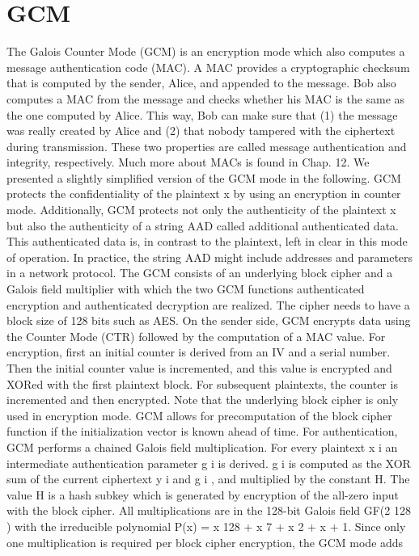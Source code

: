 \documentclass{article}
\begin{document}
\section{GCM}
The Galois Counter Mode (GCM) is an encryption mode which also computes a
message authentication code (MAC). A MAC provides a cryptographic checksum that is computed by the sender, Alice, and appended to the message. Bob also
computes a MAC from the message and checks whether his MAC is the same as
the one computed by Alice. This way, Bob can make sure that (1) the message was
really created by Alice and (2) that nobody tampered with the ciphertext during
transmission. These two properties are called message authentication and integrity,
respectively. Much more about MACs is found in Chap. 12. We presented a slightly
simplified version of the GCM mode in the following.
GCM protects the confidentiality of the plaintext x by using an encryption in
counter mode. Additionally, GCM protects not only the authenticity of the plaintext
x but also the authenticity of a string AAD called additional authenticated data.
This authenticated data is, in contrast to the plaintext, left in clear in this mode of
operation. In practice, the string AAD might include addresses and parameters in a
network protocol.
The GCM consists of an underlying block cipher and a Galois field multiplier
with which the two GCM functions authenticated encryption and authenticated decryption are realized. The cipher needs to have a block size of 128 bits such as AES.
On the sender side, GCM encrypts data using the Counter Mode (CTR) followed by
the computation of a MAC value. For encryption, first an initial counter is derived
from an IV and a serial number. Then the initial counter value is incremented, and
this value is encrypted and XORed with the first plaintext block. For subsequent
plaintexts, the counter is incremented and then encrypted. Note that the underlying
block cipher is only used in encryption mode. GCM allows for precomputation of
the block cipher function if the initialization vector is known ahead of time.
For authentication, GCM performs a chained Galois field multiplication. For every plaintext x i an intermediate authentication parameter g i is derived. g i is computed as the XOR sum of the current ciphertext y i and g i , and multiplied by the
constant H.
The value H is a hash subkey which is generated by encryption of the
all-zero input with the block cipher. All multiplications are in the 128-bit Galois
field GF(2 128 ) with the irreducible polynomial P(x) = x 128 + x 7 + x 2 + x + 1. Since
only one multiplication is required per block cipher encryption, the GCM mode adds
\end{document}
